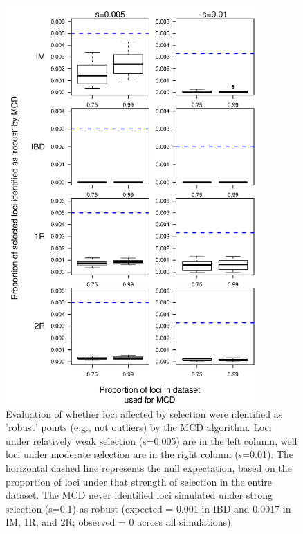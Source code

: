 \documentclass[12pt, oneside]{amsart}
\begin{document}
\newpage
\begin{figure}[h]
\begin{center}
\includegraphics[height=6in]{../figures_man2/S2-LandsharcProportionSelectedMCD.pdf}
\end{center}
\caption[]{Evaluation of whether loci affected by selection were identified as 'robust' points (e.g., not outliers) by the MCD algorithm. Loci under relatively weak selection (s=0.005) are in the left column, well loci under moderate selection are in the right column (s=0.01). The horizontal dashed line represents the null expectation, based on the proportion of loci under that strength of selection in the entire dataset. The MCD never identified loci simulated under strong selection (s=0.1) as robust (expected = 0.001 in IBD and 0.0017 in IM, 1R, and 2R; observed = 0 across all simulations).} 
 \label{fig:???}
\end{figure}
\end{document}
